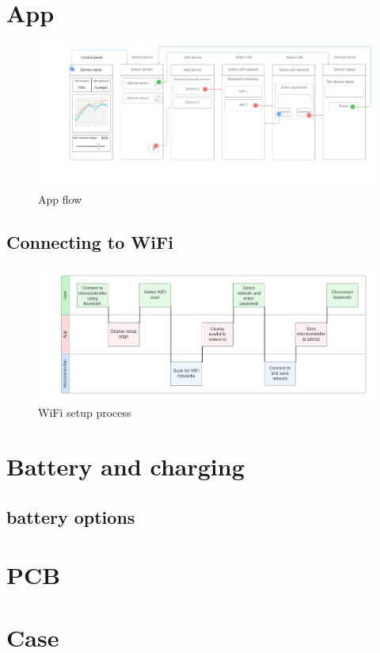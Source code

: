 \section{App}

\begin{figure}[!h]
    \centering
    \includegraphics[width= \textwidth]{Report/detail_design/fig/app_flow.png}
    \caption{App flow}
    \label{fig:app_flow}
\end{figure}

\subsection{Connecting to WiFi}
\begin{figure}[!h]
    \centering
    \includegraphics[width= \textwidth]{Report/detail_design/fig/wifi_connect.png}
    \caption{WiFi setup process}
    \label{fig:wifi_setup}
\end{figure}

\section{Battery and charging}
\label{sec:battery}
\subsection{battery options}

\section{PCB}

\section{Case}
